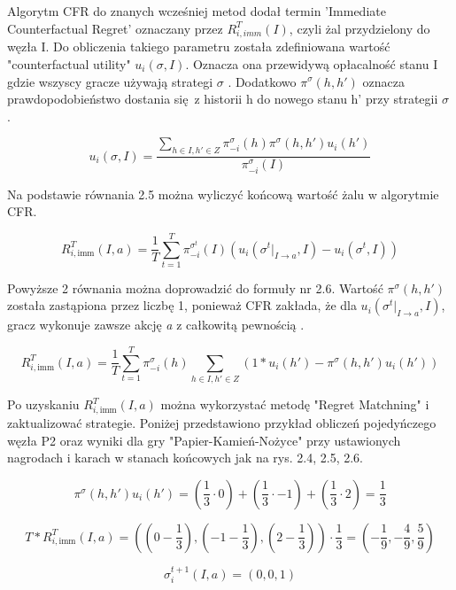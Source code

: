 \documentclass[12pt,oneside,a4paper]{report}
\begin{document}
Algorytm CFR do znanych wcześniej metod dodał termin 'Immediate Counterfactual Regret' oznaczany przez $R^{T}_{i,
imm} (I)$, 
czyli żal przydzielony do węzła I.
Do obliczenia takiego parametru została zdefiniowana wartość "counterfactual utility" $u_{i}(\sigma,
I)$. Oznacza ona przewidywą opłacalność stanu I gdzie wszyscy gracze używają strategi
$\sigma$ \cite{CFR}. Dodatkowo $\pi^{\sigma} (h, h')$ oznacza prawdopodobieństwo dostania się z historii h do 
nowego stanu h' przy strategii $\sigma$ \cite{CFR}.

\begin{equation}
   u_{i} (\sigma, I) = \frac{\sum_{h \in I, h' \in Z} \pi^{\sigma}_{-i} (h) \pi^{\sigma} (h,
   h') u_{i}(h')}{\pi_{-i}^{\sigma}(I)}
\end{equation}

Na podstawie równania 2.5 można wyliczyć końcową wartość żalu w algorytmie CFR.

\begin{equation}
   R^{T}_{i,\text{imm}} (I, a) = \frac{1}{T} \sum^{T}_{t=1} \pi^{\sigma^{t}}_{-i} (I)
   (u_{i}(\sigma^{t}|_{I \rightarrow a}, I) - u_{i}(\sigma^{t}, I))
\end{equation}


Powyższe 2 równania można doprowadzić do formuły nr 2.6. Wartość $\pi^{\sigma} (h,h')$ została
zastąpiona przez liczbę 1, ponieważ
CFR zakłada, że dla $u_{i}(\sigma^{t}|_{I \rightarrow a}, I)$, gracz wykonuje zawsze akcję \emph{a} 
z całkowitą pewnością \cite{CFR}.



\begin{equation}
   R^{T}_{i,\text{imm}} (I, a) = \frac{1}{T} \sum^{T}_{t=1}
   \pi_{-i}^{\sigma}(h)\sum_{h \in I, h' \in Z}(1*u_{i}(h') - \pi^{\sigma}(h,h')u_{i}(h'))
\end{equation}


\vspace{0.5cm}
Po uzyskaniu $R^{T}_{i,\text{imm}} (I, a)$ można wykorzystać metodę "Regret Matchning" i
zaktualizować strategie.
Poniżej przedstawiono przykład obliczeń pojedyńczego węzła P2 oraz wyniki 
dla gry "Papier-Kamień-Nożyce" przy ustawionych
nagrodach i karach w stanach końcowych jak na rys. 2.4, 2.5, 2.6.

\begin{center}
$$
   \pi^{\sigma}(h,h')u_{i}(h') =  (\frac{1}{3} \cdot 0) + (\frac{1}{3} \cdot -1) +
   (\frac{1}{3} \cdot 2) = \frac{1}{3}
$$

$$
T*R^{T}_{i,\text{imm}} (I, a) =
((0-\frac{1}{3}), (-1-\frac{1}{3}), (2-\frac{1}{3})) \cdot \frac{1}{3}= (-\frac{1}{9},
-\frac{4}{9}, \frac{5}{9}) 
$$

$$
\sigma^{t+1}_{i}\left(I, a \right) = (0, 0, 1)
$$
\end{center}
\vspace{0.5cm}
\end{document}
